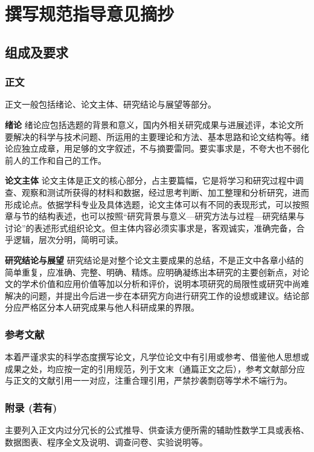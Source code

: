 \chapter{撰写规范指导意见摘抄}

\section{组成及要求}

\subsection{正文}

正文一般包括绪论、论文主体、研究结论与展望等部分。

\textbf{绪论} 绪论应包括选题的背景和意义，国内外相关研究成果与进展述评，本论文所要解决的科学与技术问题、所运用的主要理论和方法、基本思路和论文结构等。绪论应独立成章，用足够的文字叙述，不与摘要雷同。要实事求是，不夸大也不弱化前人的工作和自己的工作。

\textbf{论文主体} 论文主体是正文的核心部分，占主要篇幅，它是将学习和研究过程中调查、观察和测试所获得的材料和数据，经过思考判断、加工整理和分析研究，进而形成论点。依据学科专业及具体选题，论文主体可以有不同的表现形式，可以按照章与节的结构表述，也可以按照“研究背景与意义—研究方法与过程—研究结果与讨论”的表述形式组织论文。但主体内容必须实事求是，客观诚实，准确完备，合乎逻辑，层次分明，简明可读。

\textbf{研究结论与展望} 研究结论是对整个论文主要成果的总结，不是正文中各章小结的简单重复，应准确、完整、明确、精炼。应明确凝练出本研究的主要创新点，对论文的学术价值和应用价值等加以分析和评价，说明本项研究的局限性或研究中尚难解决的问题，并提出今后进一步在本研究方向进行研究工作的设想或建议。结论部分应严格区分本人研究成果与他人科研成果的界限。

\subsection{参考文献}

本着严谨求实的科学态度撰写论文，凡学位论文中有引用或参考、借鉴他人思想或成果之处，均应按一定的引用规范，列于文末（通篇正文之后），参考文献部分应与正文的文献引用一一对应，注重合理引用，严禁抄袭剽窃等学术不端行为。

\subsection{附录 (若有)}

主要列入正文内过分冗长的公式推导、供查读方便所需的辅助性数学工具或表格、数据图表、程序全文及说明、调查问卷、实验说明等。

